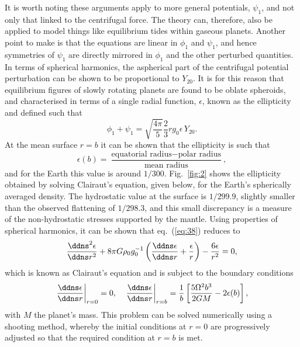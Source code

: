 It is worth noting these arguments apply to more general potentials, $\psi_{1}$, and not only that linked to the 
centrifugal force. The theory can, therefore, also be applied to model things like equilibrium tides within gaseous planets.
 Another point to make is that the equations are linear in $\phi_{1}$ and $\psi_{1}$, and hence symmetries of $\psi_{1}$ are 
 directly mirrored in $\phi_{1}$ and the other perturbed quantities. In terms of spherical harmonics, the aspherical 
 part of the centrifugal potential perturbation can be shown to be proportional to $Y_{20}$. It is for this reason that 
 equilibrium figures of slowly rotating planets are found to be oblate spheroids, and characterised in terms of a single 
 radial function, $\epsilon$, known as the ellipticity and defined such that
\begin{equation}
\phi_{1}+\psi_{1}=\sqrt{\frac{4\pi}{5}}\frac{2}{3}rg_{0}\epsilon\,Y_{20}.
\label{eq:40}
\end{equation}
At the mean surface $r=b$ it can be shown that the ellipticity is such that
\begin{equation}
\epsilon(b)=\frac{\text{equatorial radius}-\text{polar radius}}{\text{mean radius}},
\label{eq:41}
\end{equation}
and for the Earth this value is around $1/300$. Fig.~\ref{fig:2} shows the ellipticity obtained by solving Clairaut's equation, 
given below, for the Earth's spherically averaged density. The hydrostatic value at the surface is $1/299.9$, slightly smaller 
than the observed flattening of $1/298.3$, and this small discrepancy is a measure of the non-hydrostatic stresses supported 
by the mantle.
Using properties of spherical harmonics, it can be shown that eq.~(\ref{eq:38}) reduces to
\begin{equation}
\frac{\ddns^{2}\epsilon}{\ddns r^{2}}+8\pi G\rho_{0}g_{0}^{-1}\left(\frac{\ddns \epsilon}{\ddns r}+\frac{\epsilon}{r}\right)-\frac{6\epsilon}{r^{2}}=0,
\label{eq:42}
\end{equation}
which is known as Clairaut's equation and is subject to the boundary conditions
\begin{equation}
\left.\frac{\ddns \epsilon}{\ddns r}\right|_{r=0}=0, \quad \left.\frac{\ddns \epsilon}{\ddns r}\right|_{r=b}=\frac{1}{b}\left[\frac{5\Omega^{2}b^{3}}{2GM}-2\epsilon(b)\right],
\label{eq:43}
\end{equation}
with $M$ the planet's mass. This problem can be solved numerically using a shooting method, whereby the initial conditions 
at $r=0$ are progressively adjusted so that the required condition at $r=b$ is met. 



